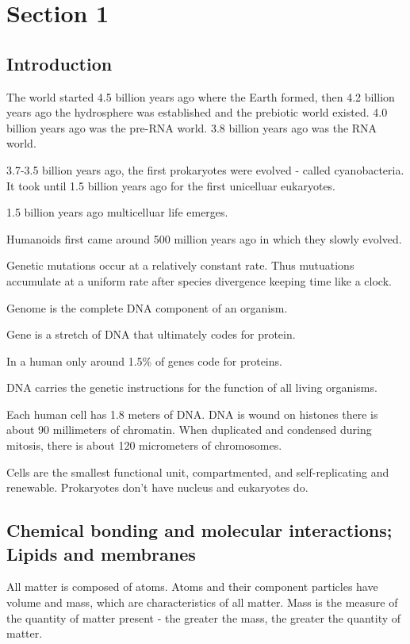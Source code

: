 \documentclass[../bio.tex]{subfiles}
\begin{document}
\chapter{Section 1}
\section{Introduction}
The world started 4.5 billion years ago where the Earth formed, then 
4.2 billion years ago the hydrosphere was established and the prebiotic world existed. 
4.0 billion years ago was the pre-RNA world. 3.8 billion years ago was the RNA world.

3.7-3.5 billion years ago, the first prokaryotes were evolved - 
called cyanobacteria. It took until 1.5 billion years ago for the 
first unicelluar eukaryotes. 

1.5 billion years ago multicelluar life emerges. 

Humanoids first came around 500 million years ago in which they slowly evolved.

Genetic mutations occur at a relatively constant rate. Thus mutuations 
accumulate at a uniform rate after species divergence keeping time like a clock.

Genome is the complete DNA component of an organism.

Gene is a stretch of DNA that ultimately codes for protein.

In a human only around 1.5\% of genes code for proteins.

DNA carries the genetic instructions for the function of all living organisms.

Each human cell has 1.8 meters of DNA. DNA is wound on histones there is 
about 90 millimeters of chromatin. When duplicated and condensed during mitosis, 
there is about 120 micrometers of chromosomes. 

Cells are the smallest functional unit, compartmented, and self-replicating and renewable. 
Prokaryotes don't have nucleus and eukaryotes do.

\section{Chemical bonding and molecular interactions; Lipids and membranes}
All matter is composed of atoms. Atoms and their component particles have 
volume and mass, which are characteristics of all matter. Mass is the measure
of the quantity of matter present - the greater the mass, the greater the
quantity of matter.
\end{document}
